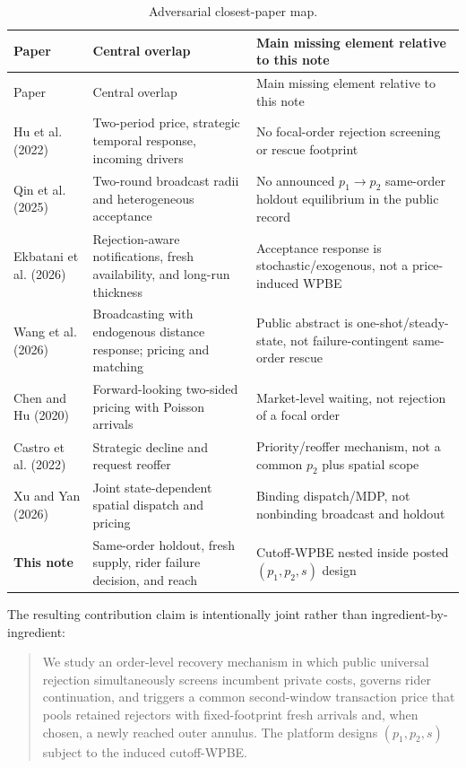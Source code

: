 \documentclass[11pt]{article}
\theoremstyle{definition}
\theoremstyle{remark}
\begin{document}
\begin{longtable}{@{}p{}p{}p{}@{}}
\caption{Adversarial closest-paper map.}\label{tab:lit}\\
\toprule
Paper & Central overlap & Main missing element relative to this note \\
\midrule
\endfirsthead
\toprule
Paper & Central overlap & Main missing element relative to this note \\
\midrule
\endhead
Hu et al. (2022) & Two-period price, strategic temporal response, incoming
drivers & No focal-order rejection screening or rescue footprint \\
Qin et al. (2025) & Two-round broadcast radii and heterogeneous acceptance &
No announced $p_1\to p_2$ same-order holdout equilibrium in the public record \\
Ekbatani et al. (2026) & Rejection-aware notifications, fresh availability,
and long-run thickness & Acceptance response is stochastic/exogenous, not a
price-induced WPBE \\
Wang et al. (2026) & Broadcasting with endogenous distance response; pricing
and matching & Public abstract is one-shot/steady-state, not
failure-contingent same-order rescue \\
Chen and Hu (2020) & Forward-looking two-sided pricing with Poisson arrivals &
Market-level waiting, not rejection of a focal order \\
Castro et al. (2022) & Strategic decline and request reoffer & Priority/reoffer
mechanism, not a common $p_2$ plus spatial scope \\
Xu and Yan (2026) & Joint state-dependent spatial dispatch and pricing &
Binding dispatch/MDP, not nonbinding broadcast and holdout \\
\textbf{This note} & Same-order holdout, fresh supply, rider failure decision,
and reach & Cutoff-WPBE nested inside posted $(p_1,p_2,s)$ design \\
\bottomrule
\end{longtable}

The resulting contribution claim is intentionally joint rather than
ingredient-by-ingredient:

\begin{quote}
We study an order-level recovery mechanism in which public universal
rejection simultaneously screens incumbent private costs, governs rider
continuation, and triggers a common second-window transaction price that pools
retained rejectors with fixed-footprint fresh arrivals and, when chosen, a
newly reached outer annulus.  The platform designs $(p_1,p_2,s)$ subject to the
induced cutoff-WPBE.
\end{quote}
\end{document}
